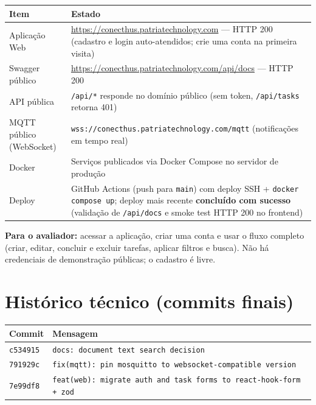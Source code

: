 \documentclass[11pt,a4paper]{article}
\begin{document}
\begin{tabularx}{\linewidth}{@{}l >{\raggedright\arraybackslash}X@{}}
  \toprule
  \textbf{Item} & \textbf{Estado} \\
  \midrule
  Aplicação Web & \url{https://conecthus.patriatechnology.com} --- HTTP 200
    (cadastro e login auto-atendidos; crie uma conta na primeira visita) \\
  Swagger público & \url{https://conecthus.patriatechnology.com/api/docs} --- HTTP 200 \\
  API pública & \texttt{/api/*} responde no domínio público
    (sem token, \texttt{/api/tasks} retorna 401) \\
  MQTT público (WebSocket) & \texttt{wss://conecthus.patriatechnology.com/mqtt}
    (notificações em tempo real) \\
  Docker & Serviços publicados via Docker Compose no servidor de produção \\
  Deploy & GitHub Actions (push para \texttt{main}) com deploy SSH +
    \texttt{docker compose up}; deploy mais recente \textbf{concluído com sucesso}
    (validação de \texttt{/api/docs} e smoke test HTTP 200 no frontend) \\
  \bottomrule
\end{tabularx}

\medskip
\textbf{Para o avaliador:} acessar a aplicação, criar uma conta e usar o fluxo
completo (criar, editar, concluir e excluir tarefas, aplicar filtros e busca). Não há
credenciais de demonstração públicas; o cadastro é livre.

\section{Histórico técnico (commits finais)}

\begin{tabularx}{\linewidth}{@{}l >{\raggedright\arraybackslash}X@{}}
  \toprule
  \textbf{Commit} & \textbf{Mensagem} \\
  \midrule
  \texttt{c534915} & \texttt{docs: document text search decision} \\
  \texttt{791929c} & \texttt{fix(mqtt): pin mosquitto to websocket-compatible version} \\
  \texttt{7e99df8} & \texttt{feat(web): migrate auth and task forms to react-hook-form + zod} \\
  \bottomrule
\end{tabularx}
\end{document}
